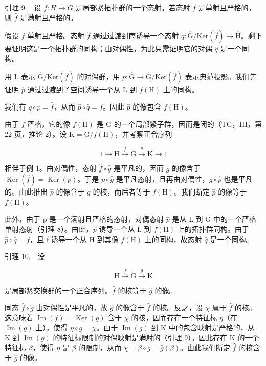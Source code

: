 引理 9.　设 \(f\colon H\to G\) 是局部紧拓扑群的一个态射。若态射 \(f\) 是单射且严格的，则 \(\widehat{f}\) 是满射且严格的。

假设 \(f\) 单射且严格。态射 \(\widehat{f}\) 通过过渡到商诱导一个态射 \(q \colon \widehat{\mathrm{G}} / \mathrm{Ker}(\widehat{f}) \to \widehat{\mathrm{H}}\)。剩下要证明这是一个拓扑群的同构；由对偶性，为此只需证明它的对偶 \(\widehat{q}\) 是一个同构。

用 L 表示 \(\widehat{\mathrm{G}}/\mathrm{Ker}(\widehat{f})\) 的对偶群，用 \(p\colon\widehat{\mathrm{G}}\to\widehat{\mathrm{G}}/\mathrm{Ker}(\widehat{f})\) 表示典范投影。我们先证明 \(\widehat{p}\) 通过过渡到子空间诱导一个从 L 到 \(f(\mathrm{H})\) 上的同构。

我们有 \(q \circ p = \widehat{f}\)，从而 \(\widehat{p} \circ \widehat{q} = f\)。因此 \(\widehat{p}\) 的像包含 \(f(\mathrm{H})\)。

由于 \(f\) 严格，它的像 \(f(\mathrm{H})\) 是 \(\mathrm{G}\) 的一个局部紧子群，因而是闭的（TG，III，第 22 页，推论 2）。设 \(\mathrm{K} = \mathrm{G}/f(\mathrm{H})\)，并考察正合序列

\[
1 \to \mathrm{H} \xrightarrow {f} \mathrm{G} \xrightarrow {g} \mathrm{K} \to 1
\]

相伴于例 1。由对偶性，态射 \(\widehat{f} \circ \widehat{g}\) 是平凡的，因而 \(\widehat{g}\) 的像含于 \(\operatorname{Ker}(\widehat{f}) = \operatorname{Ker}(p)\)。于是 \(p \circ \widehat{g}\) 是平凡态射，且再由对偶性，\(g \circ \widehat{p}\) 也是平凡的。由此推出 \(\widehat{p}\) 的像含于 \(g\) 的核，而后者等于 \(f(\mathrm{H})\)。我们断定 \(\widehat{p}\) 的像等于 \(f(\mathrm{H})\)。

此外，由于 p 是一个满射且严格的态射，对偶态射 \(\widehat{p}\) 是从 L 到 G 中的一个严格单射态射（引理 8）。由此，\(\widehat{p}\) 诱导一个从 L 到 \(f(\mathrm{H})\) 上的拓扑群同构。由于 \(\widehat{p} \circ \widehat{q} = f\)，且 f 诱导一个从 H 到其像 \(f(\mathrm{H})\) 上的同构，故态射 \(\widehat{q}\) 是一个同构。

引理 10.　设

\[
\mathrm{H} \xrightarrow {f} \mathrm{G} \xrightarrow {g} \mathrm{K}
\]

是局部紧交换群的一个正合序列。\(\hat{f}\) 的核等于 \(\hat{g}\) 的像。

同态 \(\widehat{f} \circ \widehat{g}\) 由对偶性是平凡的，故 \(\widehat{g}\) 的像含于 \(\widehat{f}\) 的核。反之，设 \(\chi\) 属于 \(\widehat{f}\) 的核。这意味着 \(\operatorname{Im}(f) = \operatorname{Ker}(g)\) 含于 \(\chi\) 的核，因而存在一个特征标 \(\eta\)（在 \(\operatorname{Im}(g)\) 上），使得 \(\eta \circ g = \chi\)。由于 \(\operatorname{Im}(g)\) 到 K 中的包含映射是严格的，从 K 到 \(\operatorname{Im}(g)\) 的特征标限制的对偶映射是满射的（引理 9）。因此存在 K 的一个特征标 \(\beta\)，使得 \(\eta\) 是 \(\beta\) 的限制，从而 \(\chi = \beta \circ g = \widehat{g}(\beta)\)。由此我们断定 \(\widehat{f}\) 的核含于 \(\widehat{g}\) 的像。

